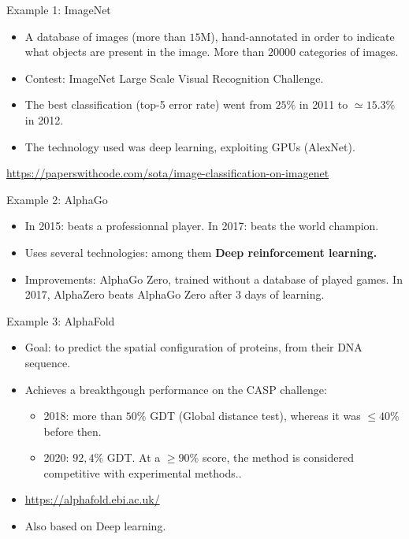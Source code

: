 \documentclass[usenames,dvipsnames]{beamer}
\begin{document}
\begin{frame}{Example 1: ImageNet}
    \begin{itemize}
        \item A database of images (more than $15$M), hand-annotated in order to
            indicate what objects are present in the image. More than $20000$
            categories of images.
        \item Contest: ImageNet Large Scale Visual Recognition Challenge.
        \item The best classification (top-5 error rate) went from $25\%$ in 2011 to
            $\simeq 15.3\%$ in 2012.
        \item The technology used was deep learning, exploiting GPUs (AlexNet).
    \end{itemize}

    \url{https://paperswithcode.com/sota/image-classification-on-imagenet} 
\end{frame}

\begin{frame}{Example 2: AlphaGo}
   \begin{itemize}
       \item In 2015: beats a professionnal player. In 2017: beats the world
           champion.
        \item Uses several technologies: among them \textbf{{Deep reinforcement
            learning.}} 
        \item Improvements: AlphaGo Zero, trained without a database of played
            games. In 2017, AlphaZero beats AlphaGo Zero after $3$ days of
            learning.
   \end{itemize} 
\end{frame}

\begin{frame}{Example 3: AlphaFold}
    \begin{itemize}
        \item Goal: to predict the spatial configuration of proteins, from
            their DNA sequence.
        \item Achieves a breakthgough performance on the CASP challenge:
            \begin{itemize}
                \item 2018: more than $50\%$ GDT (Global distance test),
                    whereas it was $\leq 40\%$ before then.
                \item 2020: $92,4\%$ GDT. At a $\geq 90\%$ score, the method is
                    considered competitive with experimental methods..
            \end{itemize}
        \item \url{https://alphafold.ebi.ac.uk/} 
        \item Also based on Deep learning.
    \end{itemize}
\end{frame}
\end{document}
